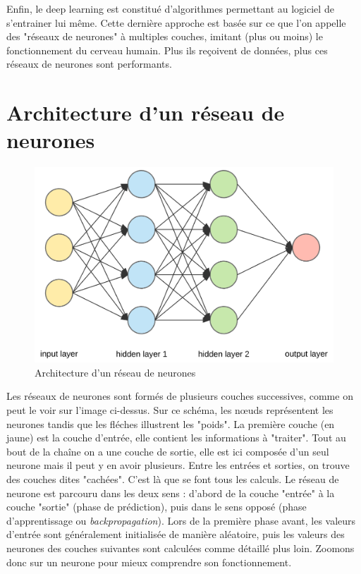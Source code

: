 	Enfin, le deep learning est constitué d'algorithmes permettant au logiciel de s'entrainer lui même. Cette dernière approche est basée sur ce que l'on appelle des "réseaux de neurones" à multiples couches, imitant (plus ou moins) le fonctionnement du cerveau humain. Plus ils reçoivent de données, plus ces réseaux de neurones sont performants.
	
\section{Architecture d'un réseau de neurones}

	\begin{figure}[H]
		\centering
		\includegraphics[width=0.75\linewidth]{images/reseau}
		\caption{Architecture d'un réseau de neurones}
	\end{figure}

	Les réseaux de neurones sont formés de plusieurs couches successives, comme on peut le voir sur l'image ci-dessus. Sur ce schéma, les n\oe uds représentent les neurones tandis que les fléches illustrent les "poids". La première couche (en jaune) est la couche d'entrée, elle contient les informations à "traiter". Tout au bout de la chaîne on a une couche de sortie, elle est ici composée d'un seul neurone mais il peut y en avoir plusieurs. Entre les entrées et sorties, on trouve des couches dites "cachées". C'est là que se font tous les calculs. Le réseau de neurone est parcouru dans les deux sens : d'abord de la couche "entrée" à la couche "sortie" (phase de prédiction), puis dans le sens opposé (phase d'apprentissage ou \textit{backpropagation}). Lors de la première phase avant, les valeurs d'entrée sont généralement initialisée de manière aléatoire, puis les valeurs des neurones des couches suivantes sont calculées comme détaillé plus loin. Zoomons donc sur un neurone pour mieux comprendre son fonctionnement.

